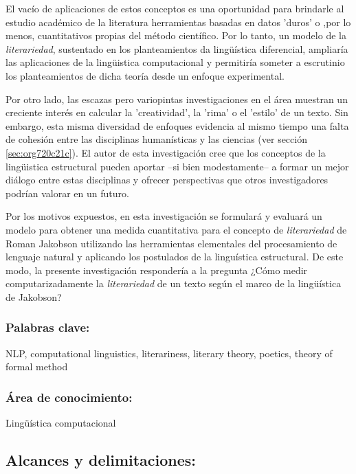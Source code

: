 \documentclass[12pt,letterpaper,twoside]{article}
\begin{document}
El vacío de aplicaciones de estos conceptos es una oportunidad para
brindarle al estudio académico de la literatura herramientas basadas
en datos 'duros' o ,por lo menos, cuantitativos propias del método
científico. Por lo tanto, un modelo de la \emph{literariedad}, sustentado
en los planteamientos da lingüística diferencial, ampliaría las
aplicaciones de la lingüistica computacional y permitiría someter a
escrutinio los planteamientos de dicha teoría desde un enfoque
experimental.

Por otro lado, las escazas pero variopintas investigaciones en el área
muestran un creciente interés en calcular la 'creatividad', la 'rima'
o el 'estilo' de un texto. Sin embargo, esta misma diversidad de
enfoques evidencia al mismo tiempo una falta de cohesión entre las
disciplinas humanísticas y las ciencias (ver sección \ref{sec:org720c21c}). El autor de esta investigación cree que los conceptos de
la lingüistica estructural pueden aportar --si bien modestamente-- a
formar un mejor diálogo entre estas disciplinas y ofrecer perspectivas
que otros investigadores podrían valorar en un futuro.

Por los motivos expuestos, en esta investigación se formulará y
evaluará un modelo para obtener una medida cuantitativa para el
concepto de \emph{literariedad} de Roman Jakobson utilizando las
herramientas elementales del procesamiento de lenguaje natural y
aplicando los postulados de la linguística estructural. De este modo,
la presente investigación respondería a la pregunta ¿Cómo medir
computarizadamente la \emph{literariedad} de un texto según el marco de la
lingüística de Jakobson?

\subsubsection{\textbf{Palabras clave:}}
\label{sec:orge78ec6e}
NLP, computational linguistics, literariness, literary theory, poetics, theory of formal method

\subsubsection{\textbf{Área de conocimiento:}}
\label{sec:org0864487}

Lingüística computacional

\subsection{Alcances y delimitaciones:}
\label{sec:orgf14e6db}
\end{document}
